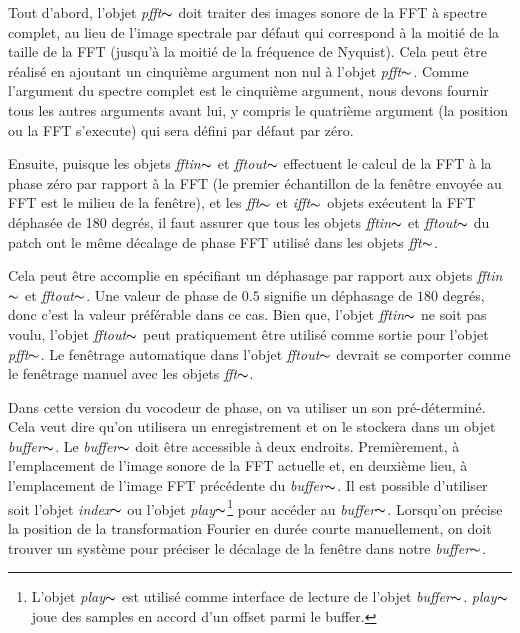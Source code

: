 Tout d'abord, l'objet \textit{pfft}$\thicksim$ doit traiter des images sonore de la FFT à spectre complet, au lieu de l'image spectrale par défaut qui correspond à la moitié de la taille de la FFT (jusqu'à la moitié de la fréquence de Nyquist). Cela peut être réalisé en ajoutant un cinquième argument non nul à l'objet \textit{pfft}$\thicksim$. Comme l'argument du spectre complet est le cinquième argument, nous devons fournir tous les autres arguments avant lui, y compris le quatrième argument (la position ou la FFT s'execute) qui sera défini par défaut par zéro.

Ensuite, puisque les objets \textit{fftin}$\thicksim$ et \textit{fftout}$\thicksim$ effectuent le calcul de la FFT à la phase zéro par rapport à la FFT (le premier échantillon de la fenêtre envoyée au FFT est le milieu de la fenêtre), et les \textit{fft}$\thicksim$ et \textit{ifft}$\thicksim$ objets exécutent la FFT déphasée de 180 degrés, il faut assurer que tous les objets \textit{fftin}$\thicksim$ et \textit{fftout}$\thicksim$ du patch ont le même décalage de phase FFT utilisé dans les objets \textit{fft}$\thicksim$.

Cela peut être accomplie en spécifiant un déphasage par rapport aux objets \textit{fftin}$\thicksim$ et \textit{fftout}$\thicksim$. Une valeur de phase de $0.5$ signifie un déphasage de $180$ degrés, donc c'est la valeur préférable dans ce cas. Bien que, l'objet \textit{fftin}$\thicksim$ ne soit pas voulu, l'objet \textit{fftout}$\thicksim$ peut pratiquement être utilisé comme sortie pour l'objet \textit{pfft}$\thicksim$. Le fenêtrage automatique dans l'objet \textit{fftout}$\thicksim$ devrait se comporter comme le fenêtrage manuel avec les objets \textit{fft}$\thicksim$.

Dans cette version du vocodeur de phase, on va utiliser un son pré-déterminé. Cela veut dire qu'on utilisera un enregistrement et on le stockera dans un objet \textit{buffer}$\thicksim$. Le \textit{buffer}$\thicksim$ doit être accessible à deux endroits. Premièrement, à l'emplacement de l'image sonore de la FFT actuelle et, en deuxième lieu, à l'emplacement de l'image FFT précédente du \textit{buffer}$\thicksim$. Il est possible d'utiliser soit l'objet \textit{index}$\thicksim$ ou l'objet \textit{play}$\thicksim$\footnote{L'objet \textit{play}$\thicksim$ est utilisé comme interface de lecture de l'objet \textit{buffer}$\thicksim$. \textit{play}$\thicksim$ joue des samples en accord d'un offset parmi le buffer.} pour accéder au \textit{buffer}$\thicksim$. Lorsqu'on précise la position de la transformation Fourier en durée courte manuellement, on doit trouver un système pour préciser le décalage de la fenêtre dans notre \textit{buffer}$\thicksim$.

